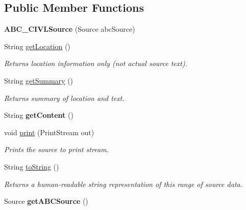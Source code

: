 \subsection*{Public Member Functions}
\begin{DoxyCompactItemize}
\item 
\hypertarget{classedu_1_1udel_1_1cis_1_1vsl_1_1civl_1_1model_1_1common_1_1ABC__CIVLSource_a5c90cb883bea0ea27c8550203ed3eae9}{}{\bfseries A\+B\+C\+\_\+\+C\+I\+V\+L\+Source} (Source abc\+Source)\label{classedu_1_1udel_1_1cis_1_1vsl_1_1civl_1_1model_1_1common_1_1ABC__CIVLSource_a5c90cb883bea0ea27c8550203ed3eae9}

\item 
String \hyperlink{classedu_1_1udel_1_1cis_1_1vsl_1_1civl_1_1model_1_1common_1_1ABC__CIVLSource_a0ae1d12a8be1c0f8de07aebf7bef3a04}{get\+Location} ()
\begin{DoxyCompactList}\small\item\em Returns location information only (not actual source text). \end{DoxyCompactList}\item 
String \hyperlink{classedu_1_1udel_1_1cis_1_1vsl_1_1civl_1_1model_1_1common_1_1ABC__CIVLSource_a9b43485f309405245a671975e45d07e6}{get\+Summary} ()
\begin{DoxyCompactList}\small\item\em Returns summary of location and text. \end{DoxyCompactList}\item 
\hypertarget{classedu_1_1udel_1_1cis_1_1vsl_1_1civl_1_1model_1_1common_1_1ABC__CIVLSource_a5bb2f84bb88da2ce513eaa3206e9cc5b}{}String {\bfseries get\+Content} ()\label{classedu_1_1udel_1_1cis_1_1vsl_1_1civl_1_1model_1_1common_1_1ABC__CIVLSource_a5bb2f84bb88da2ce513eaa3206e9cc5b}

\item 
void \hyperlink{classedu_1_1udel_1_1cis_1_1vsl_1_1civl_1_1model_1_1common_1_1ABC__CIVLSource_a50d43d746a212cf1aa217aae627f4e9b}{print} (Print\+Stream out)
\begin{DoxyCompactList}\small\item\em Prints the source to print stream. \end{DoxyCompactList}\item 
String \hyperlink{classedu_1_1udel_1_1cis_1_1vsl_1_1civl_1_1model_1_1common_1_1ABC__CIVLSource_a6f27d198cb276c99e88aeda4a7eb32f4}{to\+String} ()
\begin{DoxyCompactList}\small\item\em Returns a human-\/readable string representation of this range of source data. \end{DoxyCompactList}\item 
\hypertarget{classedu_1_1udel_1_1cis_1_1vsl_1_1civl_1_1model_1_1common_1_1ABC__CIVLSource_a1c95c5fc0c6ed0b56cbece8840406860}{}Source {\bfseries get\+A\+B\+C\+Source} ()\label{classedu_1_1udel_1_1cis_1_1vsl_1_1civl_1_1model_1_1common_1_1ABC__CIVLSource_a1c95c5fc0c6ed0b56cbece8840406860}


\end{DoxyCompactItemize}
